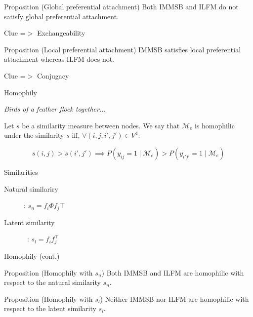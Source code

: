 \begin{frame}

\begin{block}{Proposition (Global preferential attachment)}
Both IMMSB and ILFM  do not satisfy global preferential attachment.
\end{block}
Clue =$>$ Exchangeability

\vspace{1em}

\begin{block}{Proposition (Local preferential attachment)}
IMMSB satisfies local preferential attachment whereas ILFM does not.
\end{block}
Clue =$>$ Conjugacy

\end{frame}


\begin{frame}[c]{Homophily}

\emph{Birds of a feather flock together...}
\vspace{2em}

\begin{definition}[Homophily]
Let $s$ be a similarity measure between nodes. 
We say that $\mathcal{M}_e$ is homophilic under the similarity $s$ iff, $\forall (i,j,i',j') \in V^4$:

\[ s(i,j) > s(i',j')  \implies P(y_{ij}=1 \mid \mathcal{M}_e) > P(y_{i'j'}=1  \mid \mathcal{M}_e) \]

\end{definition}

\begin{block}{Similarities}
    \begin{description}
    \item[Natural similariry] : $s_n = f_i \Phi f_j\top $
    \item[Latent similarity] \ : $s_l = f_i f_j^\top$
    \end{description} 
\end{block}

\end{frame}

\begin{frame}{Homophily (cont.)}

\begin{block}{Proposition (Homophily with $s_n$)}
Both IMMSB and ILFM are homophilic with respect to the natural similarity $s_n$.
\end{block}

\vspace{2em}

\begin{block}{Proposition (Homophily with $s_l$)}
Neither IMMSB nor ILFM are homophilic with respect to the latent similarity $s_l$.
\end{block}

\end{frame}



